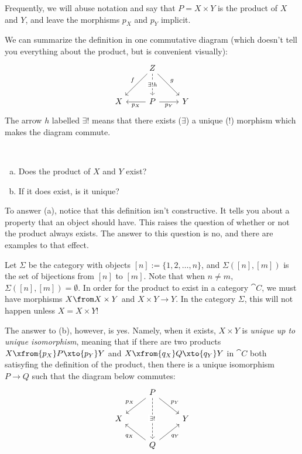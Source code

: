 \documentclass[noname]{notes}
\begin{document}
Frequently, we will abuse notation and say that $P = X \times Y$ is the product of $X$ and $Y$, and leave the morphisms $p_X$ and $p_Y$ implicit. 

We can summarize the definition in one commutative diagram (which doesn't tell you everything about the product, but is convenient visually): 
\[
\begin{tikzcd}[row sep=large]
	& Z \ar[d, dashed, "\exists ! h" description] \ar[dl, "f"'] \ar[dr, "g"] \\
	X & P \ar[l, "p_X"] \ar[r, "p_Y"'] & Y 	
\end{tikzcd}
\]
The arrow $h$ labelled $\exists!$ means that there exists ($\exists$) a unique (!) morphism which makes the diagram commute. 

\begin{question}\ 
	\begin{enumerate}[(a)]
		\item Does the product of $X$ and $Y$ exist?
		\item If it does exist, is it unique? 
	\end{enumerate}
\end{question}

To answer (a), notice that this definition isn't constructive. It tells you about a property that an object should have. This raises the question of whether or not the product always exists. The answer to this question is no, and there are examples to that effect. 

\begin{example}
	Let $\Sigma$ be the category with objects $[n] := \{1, 2, \ldots, n\}$, and $\Sigma([n],[m])$ is the set of bijections from $[n]$ to $[m]$. Note that when $n \neq m$, $\Sigma([n],[m]) = \emptyset$. In order for the product to exist in a category $\cat C$, we must have morphisms $X \from X \times Y$ and $X \times Y \to Y$. In the category $\Sigma$, this will not happen unless $X = X \times Y$! 
\end{example}

The answer to (b), however, is yes. Namely, when it exists, $X \times Y$ is \emph{unique up to unique isomorphism}, meaning that if there are two products $X \xfrom{p_X} P \xto{p_Y} Y$ and $X \xfrom{q_X} Q \xto{q_Y} Y$ in $\cat C$ both satisyfing the definition of the product, then there is a unique isomorphism $P \to Q$ such that the diagram below commutes: 
\[
	\begin{tikzcd}
		& P \ar[dd, "\exists !" description, dashed] \ar[dl, "p_X"'] \ar[dr, "p_Y"] \\
		X & & Y \\
		& Q \ar[ul, "q_X"] \ar[ur, "q_Y"'] 
	\end{tikzcd}
\]
\end{document}
